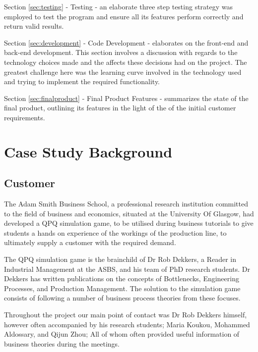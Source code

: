 \documentclass{l3proj}
\begin{document}
Section \ref{sec:testing} - Testing - an elaborate three step testing strategy was employed to test the program and ensure all its features perform correctly and return valid results.

Section \ref{sec:development} - Code Development - elaborates on the front-end and back-end development. This section involves a discussion with regards to the technology choices made and the affects these decisions had on the project. The greatest challenge here was the learning curve involved in the technology used and trying to implement the required functionality.

Section \ref{sec:finalproduct} - Final Product Features - summarizes the state of the final product, outlining its features in the light of the of the initial customer requirements.

\section{Case Study Background}
\label{sec:casestudy}

\subsection{Customer}

The Adam Smith Business School, a professional research institution committed to the field of business and economics, situated at the University Of Glasgow, had developed a QPQ simulation game, to be utilised during business tutorials to give students a hands on experience of the workings of the production line, to ultimately supply a customer with the required demand.

The QPQ simulation game is the brainchild of Dr Rob Dekkers, a Reader in Industrial Management at the ASBS, and his team of PhD research students. Dr Dekkers has written publications on the concepts of Bottlenecks, Engineering Processes, and Production Management. The solution to the simulation game consists of following a number of business process theories from these focuses.

Throughout the project our main point of contact was Dr Rob Dekkers himself, however often accompanied by his research students; Maria Koukou, Mohammed Aldossary, and Qijun Zhou; All of whom often provided useful information of business theories during the meetings.
\end{document}
